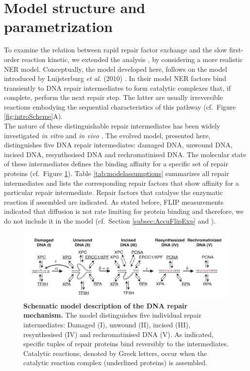 \section{Model structure and parametrization}
To examine the relation between rapid repair factor exchange and the slow first-order reaction kinetic, we extended the analysis \cite{Luijsterburg2010,Terstiege2010}, by considering a more realistic NER model. Conceptually, the model developed here, follows on the model introduced by Luijsterburg \textit{et al.} (2010) \cite{Luijsterburg2010}. In their model NER factors bind transiently to DNA repair intermediates to form catalytic complexes that, if complete, perform the next repair step. The latter are usually irreversible reactions embodying the sequential characteristics of this pathway (cf.\ Figure \ref{fig:introScheme}A).\\
The nature of these distinguishable repair intermediates has been widely investigated \textit{in vitro} and \textit{in vivo} \cite{Evans1997a,Mu1996,Polo2006,Tapias2004}.
The evolved model, presented here, distinguishes five DNA repair intermediates: damaged DNA, unwound DNA, incised DNA, resynthesised DNA and rechromatinised DNA. The molecular state of these intermediates defines the binding affinity for a specific set of repair proteins (cf.\ Figure \ref{fig:ModelStructure}). Table \ref{tab:modelassumptions} summarizes all repair intermediates and lists the corresponding repair factors that show affinity for a particular repair intermediate. Repair factors that catalyse the enzymatic reaction if assembled are indicated. As stated before, FLIP measurements indicated that diffusion is not rate limiting for protein binding and therefore, we do not include it in the model (cf.\ Section \ref{subsec:AccuFlipExp} and \cite{Rademakers2003,Zotter2006}).              


\begin{figure}[t!]
\begin{center}
\includegraphics[width=1\textwidth]{Abbildungen/figure2_5.pdf}
\caption{\textbf{Schematic model description of the DNA repair mechanism.} The model distinguishes five individual repair intermediates: Damaged (I), unwound (II), incised (III), resynthesised (IV) and rechromatinised DNA (V). As indicated, specific tuples of repair proteins bind reversibly to the intermediates. Catalytic reactions, denoted by Greek letters, occur when the catalytic reaction complex (underlined proteins) is assembled.}
\label{fig:ModelStructure}
\end{center}
\end{figure}


